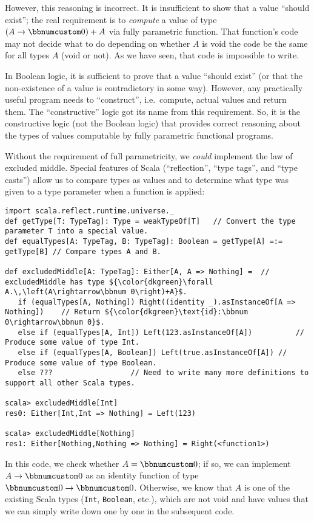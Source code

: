 However, this reasoning is incorrect. It is insufficient to show that
a value \textsf{``}should exist\textsf{''}; the real requirement is to \emph{compute}
a value of type $\left(A\rightarrow\bbnum 0\right)+A$ via fully parametric
function. That function\textsf{'}s code may not decide what to do depending
on whether $A$ is void \textemdash{} the code be the same for all
types $A$ (void or not). As we have seen, that code is impossible
to write.

In Boolean logic, it is sufficient to prove that a value \textsf{``}should
exist\textsf{''} (or that the non-existence of a value is contradictory in
some way). However, any practically useful program needs to \textsf{``}construct\textsf{''},
i.e.~compute, actual values and return them. The \textsf{``}constructive\textsf{''}
logic got its name from this requirement. So, it is the constructive
logic (not the Boolean logic) that provides correct reasoning about
the types of values computable by fully parametric functional programs.

Without the requirement of full parametricity, we \emph{could} implement
the law of excluded middle. Special
features of Scala (\textsf{``}reflection\textsf{''}, \textsf{``}type tags\textsf{''}, and \textsf{``}type
casts\textsf{''}) allow us to compare types as values and to determine what
type was given to a type parameter when a function is applied:
\begin{lstlisting}[mathescape=true]
import scala.reflect.runtime.universe._
def getType[T: TypeTag]: Type = weakTypeOf[T]   // Convert the type parameter T into a special value.
def equalTypes[A: TypeTag, B: TypeTag]: Boolean = getType[A] =:= getType[B] // Compare types A and B.

def excludedMiddle[A: TypeTag]: Either[A, A => Nothing] =  // excludedMiddle has type ${\color{dkgreen}\forall A.\,\left(A\rightarrow\bbnum 0\right)+A}$.
   if (equalTypes[A, Nothing]) Right((identity _).asInstanceOf[A => Nothing])    // Return ${\color{dkgreen}\text{id}:\bbnum 0\rightarrow\bbnum 0}$.
   else if (equalTypes[A, Int]) Left(123.asInstanceOf[A])          // Produce some value of type Int.
   else if (equalTypes[A, Boolean]) Left(true.asInstanceOf[A]) // Produce some value of type Boolean.
   else ???                  // Need to write many more definitions to support all other Scala types.

scala> excludedMiddle[Int]
res0: Either[Int,Int => Nothing] = Left(123)

scala> excludedMiddle[Nothing]
res1: Either[Nothing,Nothing => Nothing] = Right(<function1>) 
\end{lstlisting}
In this code, we check whether $A=\bbnum 0$; if so, we can implement
$A\rightarrow\bbnum 0$ as an identity function of type $\bbnum 0\rightarrow\bbnum 0$.
Otherwise, we know that $A$ is one of the existing Scala types (\lstinline!Int!,
\lstinline!Boolean!, etc.), which are not void and have values that
we can simply write down one by one in the subsequent code. 

